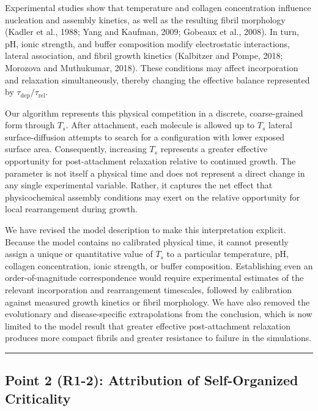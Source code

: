\documentclass[11pt]{article}
\newcommand{\pointseparator}{%
  \par\bigskip
  {\color{rulegray}\hrule}
  \par\bigskip
}
\begin{document}
Experimental studies show that temperature and collagen concentration
influence nucleation and assembly kinetics, as well as the resulting fibril
morphology (Kadler et al., 1988; Yang and Kaufman, 2009; Gobeaux et al.,
2008). In turn, pH, ionic strength, and buffer composition modify
electrostatic interactions, lateral association, and fibril growth kinetics
(Kalbitzer and Pompe, 2018; Morozova and Muthukumar, 2018). These conditions
may affect incorporation and relaxation simultaneously, thereby changing the
effective balance represented by
\(\tau_{\mathrm{dep}}/\tau_{\mathrm{rel}}\).

Our algorithm represents this physical competition in a discrete,
coarse-grained form through \(T_s\). After attachment, each molecule is allowed
up to \(T_s\) lateral surface-diffusion attempts to search for a configuration
with lower exposed surface area. Consequently, increasing \(T_s\) represents
a greater effective opportunity for post-attachment relaxation relative to
continued growth. The parameter is not itself a physical time and does not
represent a direct change in any single experimental variable. Rather, it
captures the net effect that physicochemical assembly conditions may exert on
the relative opportunity for local rearrangement during growth.

We have revised the model description to make this interpretation explicit.
Because the model contains no calibrated physical time, it cannot presently
assign a unique or quantitative value of \(T_s\) to a particular temperature,
pH, collagen concentration, ionic strength, or buffer composition.
Establishing even an order-of-magnitude correspondence would require
experimental estimates of the relevant incorporation and rearrangement
timescales, followed by calibration against measured growth kinetics or fibril
morphology. We have also removed the evolutionary and disease-specific
extrapolations from the conclusion, which is now limited to the model result
that greater effective post-attachment relaxation produces more compact
fibrils and greater resistance to failure in the simulations.

\pointseparator

\subsection*{Point 2 (R1-2): Attribution of Self-Organized Criticality}
\end{document}
